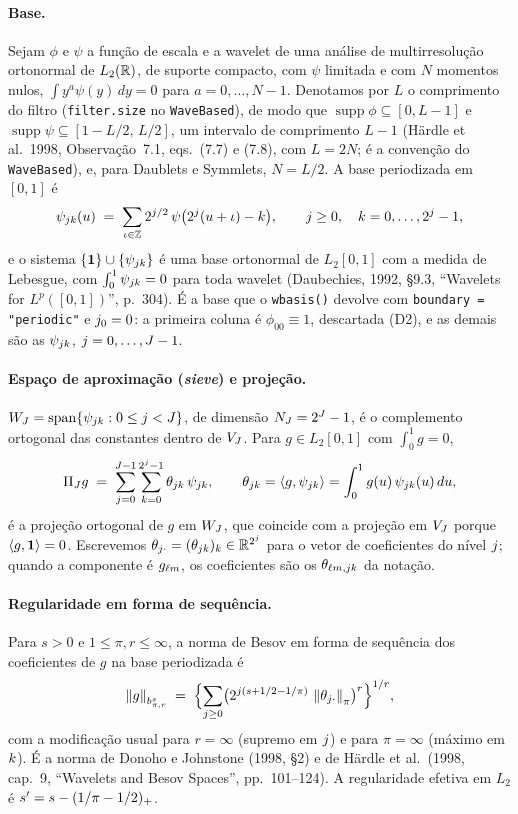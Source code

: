 \documentclass[11pt,a4paper]{article}
\begin{document}
\paragraph{Base.} Sejam $\phi$ e $\psi$ a função de escala e a wavelet de uma
análise de multirresolução ortonormal de $L_{2}(\mathbb{R})$, de suporte compacto,
com $\psi$ limitada e com $N$ momentos nulos, $\int y^{a}\psi(y)\,dy = 0$
para $a = 0, \dots, N-1$. Denotamos por $L$ o comprimento do filtro
(\texttt{filter.size} no \texttt{WaveBased}), de modo que
$\operatorname{supp}\phi \subseteq [0, L-1]$ e
$\operatorname{supp}\psi \subseteq [1 - L/2,\, L/2]$, um intervalo de
comprimento $L-1$ (Härdle et al.\ 1998, Observação~7.1, eqs.~(7.7) e (7.8),
com $L = 2N$; é a convenção do \texttt{WaveBased}), e, para Daublets e Symmlets,
$N = L/2$. A base periodizada em $[0,1]$ é
\[
  \psi_{jk}(u) \;=\; \sum_{\iota \in \mathbb{Z}} 2^{j/2}\,
  \psi\bigl(2^{j}(u + \iota) - k\bigr),
  \qquad j \ge 0,\quad k = 0, \dots, 2^{j} - 1,
\]
e o sistema $\{\mathbf{1}\} \cup \{\psi_{jk}\}$ é uma base ortonormal
de $L_{2}[0,1]$ com a medida de Lebesgue, com $\int_{0}^{1}\psi_{jk} = 0$
para toda wavelet (Daubechies, 1992, \S 9.3, ``Wavelets for $L^{p}([0,1])$'',
p.~304). É a base que o \texttt{wbasis()} devolve com
\texttt{boundary = "periodic"} e $j_{0} = 0$: a primeira coluna é
$\phi_{00} \equiv 1$, descartada (D2), e as demais são as $\psi_{jk}$,
$j = 0, \dots, J-1$.

\paragraph{Espaço de aproximação (\emph{sieve}) e projeção.}
$W_{J} = \operatorname{span}\{\psi_{jk} : 0 \le j < J\}$, de dimensão $N_{J} = 2^{J} - 1$, é o complemento ortogonal
das constantes dentro de $V_{J}$. Para $g \in L_{2}[0,1]$ com $\int_{0}^{1} g = 0$,
\[
  \Pi_{J} g \;=\; \sum_{j = 0}^{J-1}\sum_{k = 0}^{2^{j}-1}
  \theta_{jk}\,\psi_{jk},
  \qquad \theta_{jk} = \langle g, \psi_{jk} \rangle
  = \int_{0}^{1} g(u)\,\psi_{jk}(u)\,du,
\]
é a projeção ortogonal de $g$ em $W_{J}$, que coincide com a projeção em $V_{J}$
porque $\langle g, \mathbf{1} \rangle = 0$. Escrevemos $\theta_{j\cdot} =
(\theta_{jk})_{k}\in\mathbb{R}^{2^{j}}$ para o vetor de coeficientes do
nível $j$; quando a componente é $g_{\ell m}$, os coeficientes são
os $\theta_{\ell m,jk}$ da notação.

\paragraph{Regularidade em forma de sequência.} Para $s > 0$ e
$1 \le \pi, r \le \infty$, a norma de Besov em forma de sequência dos
coeficientes de $g$ na base periodizada é
\[
  \left\lVert g \right\rVert_{b^{s}_{\pi,r}} \;=\;
  \Bigl\{\sum_{j \ge 0}\bigl(2^{j(s + 1/2 - 1/\pi)}\,
  \left\lVert \theta_{j\cdot} \right\rVert_{\pi}\bigr)^{r}\Bigr\}^{1/r},
\]
com a modificação usual para $r = \infty$ (supremo em $j$) e para
$\pi = \infty$ (máximo em $k$). É a norma de Donoho e Johnstone (1998,
\S 2) e de Härdle et al.\ (1998, cap.~9, ``Wavelets and Besov Spaces'',
pp.~101--124). A
regularidade efetiva em $L_{2}$ é $s' = s - (1/\pi - 1/2)_{+}$.
\end{document}
